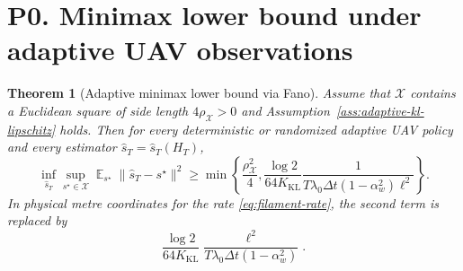 \documentclass[11pt]{article}
\newtheorem{theorem}{Theorem}
\DeclareMathOperator{\E}{\mathbb{E}}
\newcommand{\X}{\mathcal{X}}
\newcommand{\dt}{\Delta t}
\begin{document}
\section{P0. Minimax lower bound under adaptive UAV observations}

\begin{theorem}[Adaptive minimax lower bound via Fano]\label{thm:p0-minimax}
Assume that $\X$ contains a Euclidean square of side length $4\rho_{\X}>0$ and Assumption~\ref{ass:adaptive-kl-lipschitz} holds.  Then for every deterministic or randomized adaptive UAV policy and every estimator $\widehat{s}_T=\widehat{s}_T(H_T)$,
\begin{equation}
        \inf_{\widehat{s}_T}\sup_{s^\star\in\X}
        \E_{s^\star}\|\widehat{s}_T-s^\star\|^2
        \geq
        \min\!\left\{
        \frac{\rho_{\X}^2}{4},
        \frac{\log 2}{64K_{\mathrm{KL}}}
        \frac{1}{T\lambda_0\dt(1-\alpha_w^2)\ell^2}
        \right\}.
        \label{eq:p0-minimax-bound}
\end{equation}
In physical metre coordinates for the rate \eqref{eq:filament-rate}, the second term is replaced by
\[
        \frac{\log 2}{64K_{\mathrm{KL}}}
        \frac{\ell^2}{T\lambda_0\dt(1-\alpha_w^2)} .
\]
\end{theorem}
\end{document}
